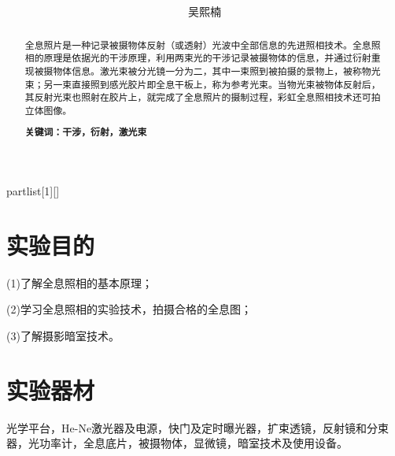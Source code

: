 \documentclass[UTF8]{ctexart}
\author{
	吴熙楠}
\title{
	\heiti{全息照相实验报告}
}
\begin{document}
	\maketitle
	\newtheorem{definition}{定义}[subsection]
	\newtheorem{function}{公式}[subsection]
	\newtheorem{summary}{小结}[subsection]
	\newtheorem{deduction}{推论}[subsection]
	\newtheorem{property}{性质}[subsection]
	\newtheorem{theo}{定理}[subsection]
	\newtheorem{step}{步骤}[subsection]
	\newtheorem{remark}{注记}[subsection]
	\newtheorem{proof}{证明}[subsection]
	\newenvironment{Theorem}[1][]{\par\noindent\textbf{定理}(#1)\quad}{\par}
	\newcommand{\rbra}[1]{\left( #1 \right)}
	\newcommand{\sbra}[1]{\left[ #1 \right]}
	\newcommand{\cbra}[1]{\left\{ #1 \right\}}
	\newcommand{\pbra}[1]{\left< #1 \right>}
	\newcommand{\abs}[1]{\left| #1 \right|}
	\newcommand{\fs}[2]{\displaystyle\frac{#1}{#2}}
	
	\newenvironment{myproof}{{\color{blue}证：}}
	
	\newenvironment{partlist}[1][]
	{\begin{enumerate}[itemsep=0pt, label=(\arabic*), wide, labelindent=\parindent, listparindent=\parindent, #1]}
		{\end{enumerate}}
	
	\renewcommand{\contentsname}{目录} %
	\tableofcontents
	\newpage
	\renewcommand{\abstractname}{\large 摘要\\}
	\begin{abstract}
		全息照片是一种记录被摄物体反射（或透射）光波中全部信息的先进照相技术。全息照相的原理是依据光的干涉原理，利用两束光的干涉记录被摄物体的信息，并通过衍射重现被摄物体信息。激光束被分光镜一分为二，其中一束照到被拍摄的景物上，被称物光束；另一束直接照到感光胶片即全息干板上，称为参考光束。当物光束被物体反射后，其反射光束也照射在胶片上，就完成了全息照片的摄制过程，彩虹全息照相技术还可拍立体图像。
		
		\textbf{关键词：干涉，衍射，激光束}
	\end{abstract}
	\section{实验目的}
	(1)了解全息照相的基本原理；
	\par (2)学习全息照相的实验技术，拍摄合格的全息图；
	\par (3)了解摄影暗室技术。
	\section{实验器材}
	光学平台，He-Ne激光器及电源，快门及定时曝光器，扩束透镜，反射镜和分束器，光功率计，全息底片，被摄物体，显微镜，暗室技术及使用设备。
\end{document}
